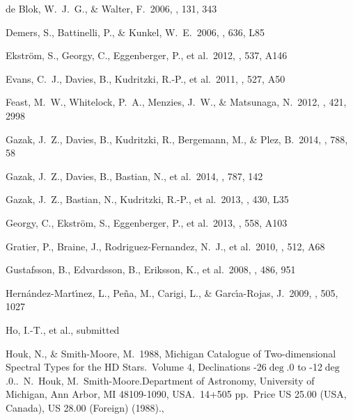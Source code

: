 \documentclass[iop]{emulateapj}
\begin{document}
\begin{thebibliography}{}
 de Blok, W.~J.~G., \& Walter, F.\ 2006, \aj, 131, 343 

 Demers, S., Battinelli, 
P., \& Kunkel, W.~E.\ 2006, \apjl, 636, L85 

 Ekstr{\"o}m, S., Georgy, C., Eggenberger, P., et al.\ 2012, \aap, 537, A146 

 Evans, C.~J., Davies, B., Kudritzki, R.-P., et al.\ 2011, \aap, 527, A50 

 Feast, M.~W., Whitelock, 
P.~A., Menzies, J.~W., \& Matsunaga, N.\ 2012, \mnras, 421, 2998 

 Gazak, J.~Z., Davies, B., 
Kudritzki, R., Bergemann, M., \& Plez, B.\ 2014, \apj, 788, 58 

 Gazak, J.~Z., Davies, B., 
Bastian, N., et al.\ 2014, \apj, 787, 142 

 Gazak, J.~Z., Bastian, 
N., Kudritzki, R.-P., et al.\ 2013, \mnras, 430, L35 

 Georgy, C., Ekstr{\"o}m, S., Eggenberger, P., et al.\ 2013, \aap, 558, A103 

 Gratier, P., Braine, J., Rodriguez-Fernandez, N.~J., et al.\ 2010, \aap, 512, A68 

 Gustafsson, B., Edvardsson, B., Eriksson, K., et al.\ 2008, \aap, 486, 951 

 Hern{\'a}ndez-Mart{\'{\i}}nez, L., Pe{\~n}a, M., Carigi, L., \& Garc{\'{\i}}a-Rojas, J.\ 2009, \aap, 505, 1027 

 Ho,  I.-T., 
et al., submitted

 Houk, N., \& Smith-Moore, M.\ 1988, Michigan Catalogue of Two-dimensional Spectral Types for the HD Stars.~Volume 4, Declinations -26{$\deg$}.0 to -12{$\deg$}.0..~N.~Houk, M.~Smith-Moore.Department of Astronomy, University of Michigan, Ann Arbor, MI 48109-1090, USA.~14+505 pp.~Price US 25.00 (USA, Canada), US 28.00 (Foreign) (1988).,  


\end{thebibliography}
\end{document}
